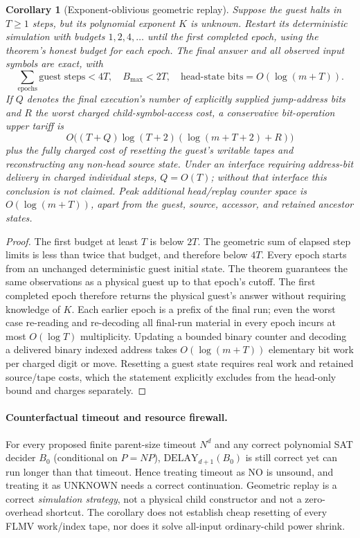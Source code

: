 \documentclass[11pt]{article}
\newtheorem{corollary}[theorem]{Corollary}
\begin{document}
\begin{corollary}[Exponent-oblivious geometric replay]
Suppose the guest halts in $T\ge1$ steps, but its polynomial exponent $K$ is unknown. Restart its deterministic simulation with budgets $1,2,4,\ldots$ until the first completed epoch, using the theorem's honest budget for each epoch. The final answer and all observed input symbols are exact, with
\[
\sum_{\mathrm{epochs}}\text{guest steps}<4T,\quad
B_{\max}<2T,\quad
\text{head-state bits}=O(\log(m+T)).
\]
If $Q$ denotes the \emph{final execution's} number of explicitly supplied jump-address bits and $R$ the worst charged child-symbol-access cost, a conservative bit-operation upper tariff is
\[
O\!\bigl((T+Q)\log(T+2)(\log(m+T+2)+R)\bigr)
\]
plus the fully charged cost of resetting the guest's writable tapes and reconstructing any non-head source state. Under an interface requiring address-bit delivery in charged individual steps, $Q=O(T)$; without that interface this conclusion is \emph{not} claimed. Peak additional head/replay counter space is $O(\log(m+T))$, apart from the guest, source, accessor, and retained ancestor states.
\end{corollary}
\begin{proof}
The first budget at least $T$ is below $2T$. The geometric sum of elapsed step limits is less than twice that budget, and therefore below $4T$. Every epoch starts from an unchanged deterministic guest initial state. The theorem guarantees the same observations as a physical guest up to that epoch's cutoff. The first completed epoch therefore returns the physical guest's answer without requiring knowledge of $K$. Each earlier epoch is a prefix of the final run; even the worst case re-reading and re-decoding all final-run material in every epoch incurs at most $O(\log T)$ multiplicity. Updating a bounded binary counter and decoding a delivered binary indexed address takes $O(\log(m+T))$ elementary bit work per charged digit or move. Resetting a guest state requires real work and retained source/tape costs, which the statement explicitly excludes from the head-only bound and charges separately. \end{proof}

\paragraph{Counterfactual timeout and resource firewall.}
For every proposed finite parent-size timeout $N^d$ and any correct polynomial SAT decider $B_0$ (conditional on $P=NP$), $\mathrm{DELAY}_{d+1}(B_0)$ is still correct yet can run longer than that timeout. Hence treating timeout as NO is unsound, and treating it as UNKNOWN needs a correct continuation. Geometric replay is a correct \emph{simulation strategy}, not a physical child constructor and not a zero-overhead shortcut. The corollary does not establish cheap resetting of every FLMV work/index tape, nor does it solve all-input ordinary-child power shrink.
\end{document}
